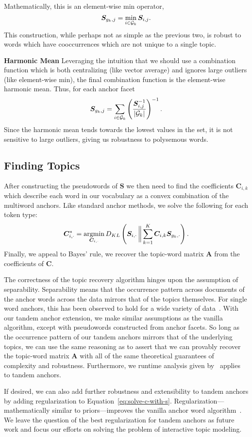 Mathematically, this is an element-wise min operator,
\begin{equation}
\bm{S}_{g_k,j} = \min_{i \in \mathcal{G}_{k}} \bm{S}_{i, j}.
\label{eq:vector-min}
\end{equation}
This construction, while perhaps not as simple as the previous two, is robust
to words which have cooccurrences which are not unique to a single topic.

\textbf{Harmonic Mean}
Leveraging the intuition that we should use a combination function which is
both centralizing (like vector average) and ignores large outliers (like
element-wise min), the final combination function is the element-wise harmonic
mean.
Thus, for each anchor facet
\begin{equation}
\bm{S}_{g_k,j} = \sum_{i \in
\mathcal{G}_{k}}\left(\frac{\bm{S}_{i,j}^{-1}}{|\mathcal{G}_{k}|} \right)^{-1}.
\end{equation}
Since the harmonic mean tends towards the lowest values in the set, it is not
sensitive to large outliers, giving us robustness to polysemous words.

\subsection{Finding Topics}

After constructing the pseudowords of $\bm{S}$ we
then need to find the coefficients $\bm{C}_{i,k}$ which describe each word in our
vocabulary as a convex combination of the multiword anchors.
Like standard anchor methods, we solve the
following for each token type:
\begin{equation}
\bm{C}^*_{i,\cdot} = \argmin_{\bm{C}_{i,\cdot}} D_{KL} \left( \bm{S}_{i,\cdot}\, \bigg\| \sum_{k=1}^K \bm{C}_{i,k} \bm{S}_{g_k,\cdot} \right).
\label{eq:solve-c-with-s}
\end{equation}
Finally, we appeal to Bayes' rule, we recover the topic-word matrix $\bm{A}$
from the coefficients of $\bm{C}$.

The correctness of the topic recovery algorithm hinges upon the assumption of
separability.
Separability means that the occurrence pattern across documents of the anchor
words across the data mirrors that of the topics themselves.
For single word anchors, this has been observed to hold for a wide variety of
data~\cite{beyond-svd}.
With our tandem anchor extension, we make similar assumptions as the vanilla
algorithm, except with pseudowords constructed from anchor facets.
So long as the occurrence pattern of our tandem anchors mirrors that of the
underlying topics, we can use the same reasoning as  to
assert that we can provably recover the topic-word matrix $\bm{A}$ with all of
the same theoretical guarantees of complexity and robustness.
Furthermore, we runtime analysis given by~ applies
to tandem anchors.

If desired, we can also add further robustness and extensibility to tandem
anchors by adding regularization to Equation~\ref{eq:solve-c-with-s}.
Regularization---mathematically similar to
priors---improves the vanilla anchor word
algorithm~\cite{anchors-regularized}.
We leave the question of the best regularization for tandem anchors as future
work and focus our efforts on solving the problem of interactive topic
modeling.
